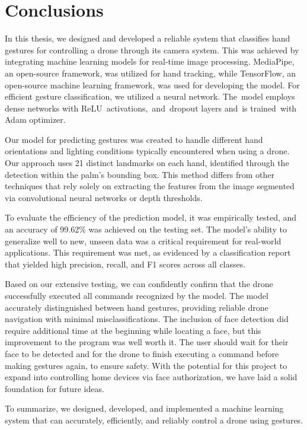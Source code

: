 \chapter{Conclusions}
In this thesis, we designed and developed
a reliable system that classifies hand gestures for controlling a drone through its camera system.
This was achieved by integrating machine learning models for real-time image processing. MediaPipe, an open-source framework, was utilized for hand tracking, while TensorFlow, an open-source machine learning framework, was used for developing the model. 
For efficient gesture classification, we utilized a neural network. The model employs dense networks with ReLU activations, and dropout layers and is trained with Adam optimizer.


Our model for predicting gestures was created to handle different hand orientations and lighting conditions typically encountered when using a drone. Our approach uses 21 distinct landmarks on each hand, identified through the detection within the palm's bounding box. This method differs from other techniques that rely solely on extracting the features from the image segmented via convolutional neural networks or depth thresholds.


To evaluate the efficiency of the prediction model, it was empirically tested, and an accuracy of 99.62\% was achieved on the testing set. The model's ability to generalize well to new, unseen data was a critical requirement for real-world applications. This requirement was met, as evidenced by a classification report that yielded high precision, recall, and F1 scores across all classes. 


Based on our extensive testing, we can confidently confirm that the drone successfully executed all commands recognized by the model. The model accurately distinguished between hand gestures, providing reliable drone navigation with minimal misclassifications. The inclusion of face detection did require additional time at the beginning while locating a face, but this improvement to the program was well worth it. The user should wait for their face to be detected and for the drone to finish executing a command before making gestures again, to ensure safety.  With the potential for this project to expand into controlling home devices via face authorization, we have laid a solid foundation for future ideas.

To summarize, we designed, developed, and implemented a machine learning system that can accurately, efficiently, and reliably control a drone using gestures.

